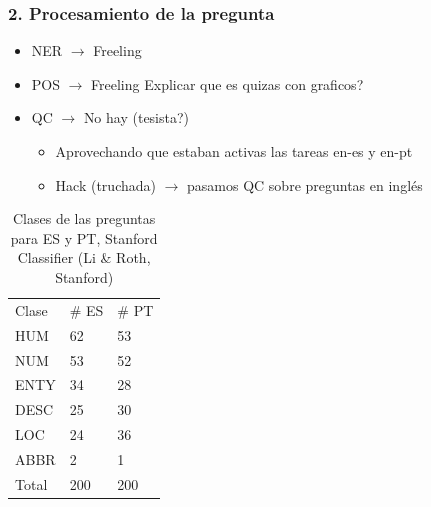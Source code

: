 \begin{frame}
\frametitle{2. Procesamiento de la pregunta}
  \begin{itemize}
    \item NER $\rightarrow$ Freeling
    \item POS $\rightarrow$ Freeling {\color{red} Explicar que es quizas con graficos?}
    \item QC $\rightarrow$ {\color{red}No hay} (tesista?)
    \begin{itemize}
        \item Aprovechando que estaban activas las tareas en-es y en-pt
        \item Hack (truchada)  $\rightarrow$ pasamos QC sobre preguntas en inglés
    \end{itemize}
  \end{itemize}

  \begin{table}
    \centering
    \begin{center}
    \begin{tabular}{| l | l | l | }
    Clase & \# ES  & \# PT \\ 
    HUM &  62 & 53 \\ 
    NUM &  53 & 52\\ 
    ENTY &  34 & 28\\ 
    DESC &  25 & 30\\ 
    LOC &  24 & 36\\ 
    ABBR &  2 & 1\\ 
    Total & 200 & 200 \\
    \end{tabular}
    \caption{Clases de las preguntas para ES y PT, Stanford Classifier (Li \& Roth, Stanford)}
    \label{table:qc-es-pt}
    \end{center}
  \end{table}
\end{frame}



